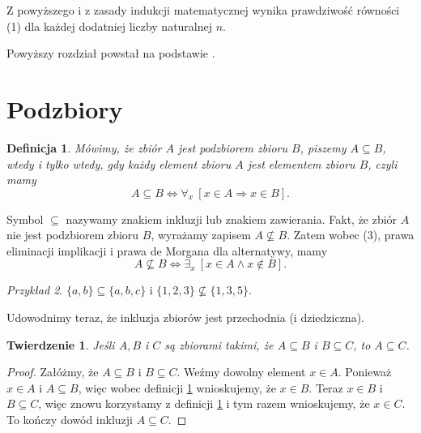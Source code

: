 \documentclass[a4paper,12pt]{article}
\newtheorem{definition}{Definicja}
\newtheorem{theorem}{Twierdzenie}
\theoremstyle{remark}
\newtheorem{example}[definition]{Przykład}
\begin{document}
Z powyższego i z zasady indukcji matematycznej wynika prawdziwość równości (1) dla każdej dodatniej liczby naturalnej $n$.

Powyższy rozdział powstał na podstawie \cite{WDM}.

\section{Podzbiory}

\begin{definition}
    \label{podzbior}
    Mówimy, że zbiór $A$ jest podzbiorem zbioru $B$, piszemy $A \subseteq B$, wtedy i tylko wtedy, gdy każdy element zbioru $A$ jest elementem zbioru $B$, czyli mamy
    \begin{equation}
        A \subseteq B \Leftrightarrow \forall_x \ [x \in A \Rightarrow x \in B].
    \end{equation}
\end{definition}

Symbol $\subseteq$ nazywamy znakiem inkluzji lub znakiem zawierania. Fakt, że zbiór $A$ nie jest podzbiorem zbioru $B$, wyrażamy zapisem $A \nsubseteq B$. Zatem wobec (3), prawa eliminacji implikacji i prawa de Morgana dla alternatywy, mamy
\begin{equation}
    A \nsubseteq B \Leftrightarrow \exists_x \ [x \in A \land x \notin B].
\end{equation}

\begin{example}
    $\{a,b\} \subseteq \{a,b,c\}$ i $\{1,2,3\} \nsubseteq \{1,3,5\}$.
\end{example}

Udowodnimy teraz, że inkluzja zbiorów jest przechodnia (i dziedziczna).

\begin{theorem}
    Jeśli $A, B$ i $C$ są zbiorami takimi, że $A \subseteq B$ i $B \subseteq C$, to $A \subseteq C$.
\end{theorem}

\begin{proof}
    Załóżmy, że $A \subseteq B$ i $B \subseteq C$. Weźmy dowolny element $x \in A$.
    Ponieważ $x \in A$ i $A \subseteq B$, więc wobec definicji \ref{podzbior} wnioskujemy, że $x \in B$.
    Teraz $x \in B$ i $B \subseteq C$, więc znowu korzystamy z definicji \ref{podzbior} i tym razem
    wnioskujemy, że $x \in C$. To kończy dowód inkluzji $A \subseteq C$.
\end{proof}

\newpage
\end{document}
